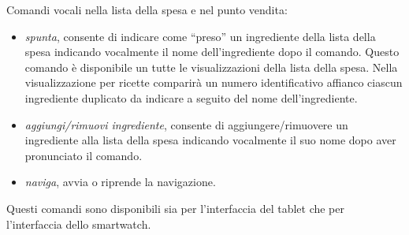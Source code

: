 Comandi vocali nella lista della spesa e nel punto vendita:
\begin{itemize}
\item \emph{spunta}, consente di indicare come ``preso'' un ingrediente
della lista della spesa indicando vocalmente il nome dell'ingrediente
dopo il comando. Questo comando è disponibile un tutte le
visualizzazioni della lista della spesa. Nella visualizzazione per
ricette comparirà un numero identificativo affianco ciascun ingrediente
duplicato da indicare a seguito del nome dell'ingrediente.
\item \emph{aggiungi/rimuovi ingrediente}, consente di
aggiungere/rimuovere un ingrediente
alla lista della spesa indicando vocalmente il suo nome dopo aver
pronunciato il comando.
\item \emph{naviga}, avvia o riprende la navigazione.
\end{itemize}
Questi comandi sono disponibili sia per l'interfaccia del tablet che per
l'interfaccia dello smartwatch.

